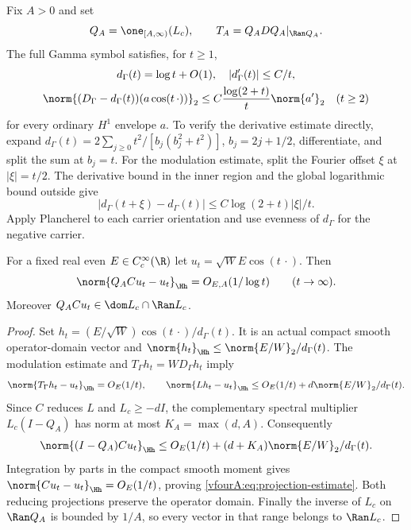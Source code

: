 Fix $A>0$ and set
\begin{equation}\label{vfourA:eq:positive-range}
 Q_A=\one_{[A,\infty)}(L_c),\qquad
 T_A=Q_ADQ_A|_{\Ran Q_A}.
\end{equation}
The full Gamma symbol satisfies, for $t\ge1$,
\begin{equation}\label{vfourA:eq:modulation}
 \begin{gathered}
 d_\Gamma(t)=\log t+O(1),\quad |d_\Gamma'(t)|\le C/t,
 \\
 \norm{(D_\Gamma-d_\Gamma(t))(a\cos(t\,\cdot))}_2
 \le C\frac{\log(2+t)}t\norm{a'}_2\quad(t\ge2)
 \end{gathered}
\end{equation}
for every ordinary $H^1$ envelope $a$.
To verify the derivative estimate directly, expand
$d_\Gamma(t)=2\sum_{j\ge0}t^2/[b_j(b_j^2+t^2)]$,
$b_j=2j+1/2$, differentiate, and split the sum at $b_j=t$.
For the modulation estimate, split the Fourier offset $\xi$ at
$|\xi|=t/2$.  The derivative bound in the inner region and the
global logarithmic bound outside give
\[
 |d_\Gamma(t+\xi)-d_\Gamma(t)|
 \le C\log(2+t)|\xi|/t.
\]
Apply Plancherel to each carrier orientation and use evenness of
$d_\Gamma$ for the negative carrier.

\begin{lemma}
\label{vfourA:lem:projection}
For a fixed real even $E\in C_c^\infty(\R)$ let
$u_t=\sqrt W E\cos(t\,\cdot)$.  Then
\begin{equation}\label{vfourA:eq:projection-estimate}
 \norm{Q_ACu_t-u_t}_{\Hh}=O_{E,A}(1/\log t)
 \qquad(t\to\infty).
\end{equation}
Moreover $Q_ACu_t\in\dom L_c\cap\Ran L_c$.
\end{lemma}
\begin{proof}
Set $h_t=(E/\sqrt W)\cos(t\,\cdot)/d_\Gamma(t)$.
It is an actual compact smooth operator-domain vector and
$\norm{h_t}_{\Hh}\le\norm{E/W}_2/d_\Gamma(t)$.
The modulation estimate and $T_\Gamma h_t=WD_\Gamma h_t$ imply
\[
 \norm{T_\Gamma h_t-u_t}_{\Hh}=O_E(1/t),\qquad
 \norm{Lh_t-u_t}_{\Hh}
 \le O_E(1/t)+d\norm{E/W}_2/d_\Gamma(t).
\]
Since $C$ reduces $L$ and $L_c\ge-dI$, the complementary spectral
multiplier $L_c(I-Q_A)$ has norm at most $K_A=\max(d,A)$.
Consequently
\[
 \norm{(I-Q_A)Cu_t}_{\Hh}
 \le O_E(1/t)+(d+K_A)\norm{E/W}_2/d_\Gamma(t).
\]
Integration by parts in the compact smooth moment gives
$\norm{Cu_t-u_t}_{\Hh}=O_E(1/t)$, proving
\eqref{vfourA:eq:projection-estimate}.  Both reducing projections
preserve the operator domain.  Finally the inverse of $L_c$ on
$\Ran Q_A$ is bounded by $1/A$, so every vector in that range
belongs to $\Ran L_c$.
\end{proof}

